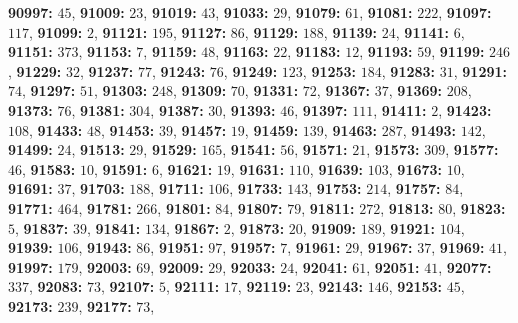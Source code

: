 \textsf{\bfseries 90997:} $45$, \textsf{\bfseries 91009:} $23$, \textsf{\bfseries 91019:} $43$, \textsf{\bfseries 91033:} $29$, \textsf{\bfseries 91079:} $61$, \textsf{\bfseries 91081:} $222$, \textsf{\bfseries 91097:} $117$, \textsf{\bfseries 91099:} $2$, \textsf{\bfseries 91121:} $195$, \textsf{\bfseries 91127:} $86$, \textsf{\bfseries 91129:} $188$, \textsf{\bfseries 91139:} $24$, \textsf{\bfseries 91141:} $6$, \textsf{\bfseries 91151:} $373$, \textsf{\bfseries 91153:} $7$, \textsf{\bfseries 91159:} $48$, \textsf{\bfseries 91163:} $22$, \textsf{\bfseries 91183:} $12$, \textsf{\bfseries 91193:} $59$, \textsf{\bfseries 91199:} $246$, \textsf{\bfseries 91229:} $32$, \textsf{\bfseries 91237:} $77$, \textsf{\bfseries 91243:} $76$, \textsf{\bfseries 91249:} $123$, \textsf{\bfseries 91253:} $184$, \textsf{\bfseries 91283:} $31$, \textsf{\bfseries 91291:} $74$, \textsf{\bfseries 91297:} $51$, \textsf{\bfseries 91303:} $248$, \textsf{\bfseries 91309:} $70$, \textsf{\bfseries 91331:} $72$, \textsf{\bfseries 91367:} $37$, \textsf{\bfseries 91369:} $208$, \textsf{\bfseries 91373:} $76$, \textsf{\bfseries 91381:} $304$, \textsf{\bfseries 91387:} $30$, \textsf{\bfseries 91393:} $46$, \textsf{\bfseries 91397:} $111$, \textsf{\bfseries 91411:} $2$, \textsf{\bfseries 91423:} $108$, \textsf{\bfseries 91433:} $48$, \textsf{\bfseries 91453:} $39$, \textsf{\bfseries 91457:} $19$, \textsf{\bfseries 91459:} $139$, \textsf{\bfseries 91463:} $287$, \textsf{\bfseries 91493:} $142$, \textsf{\bfseries 91499:} $24$, \textsf{\bfseries 91513:} $29$, \textsf{\bfseries 91529:} $165$, \textsf{\bfseries 91541:} $56$, \textsf{\bfseries 91571:} $21$, \textsf{\bfseries 91573:} $309$, \textsf{\bfseries 91577:} $46$, \textsf{\bfseries 91583:} $10$, \textsf{\bfseries 91591:} $6$, \textsf{\bfseries 91621:} $19$, \textsf{\bfseries 91631:} $110$, \textsf{\bfseries 91639:} $103$, \textsf{\bfseries 91673:} $10$, \textsf{\bfseries 91691:} $37$, \textsf{\bfseries 91703:} $188$, \textsf{\bfseries 91711:} $106$, \textsf{\bfseries 91733:} $143$, \textsf{\bfseries 91753:} $214$, \textsf{\bfseries 91757:} $84$, \textsf{\bfseries 91771:} $464$, \textsf{\bfseries 91781:} $266$, \textsf{\bfseries 91801:} $84$, \textsf{\bfseries 91807:} $79$, \textsf{\bfseries 91811:} $272$, \textsf{\bfseries 91813:} $80$, \textsf{\bfseries 91823:} $5$, \textsf{\bfseries 91837:} $39$, \textsf{\bfseries 91841:} $134$, \textsf{\bfseries 91867:} $2$, \textsf{\bfseries 91873:} $20$, \textsf{\bfseries 91909:} $189$, \textsf{\bfseries 91921:} $104$, \textsf{\bfseries 91939:} $106$, \textsf{\bfseries 91943:} $86$, \textsf{\bfseries 91951:} $97$, \textsf{\bfseries 91957:} $7$, \textsf{\bfseries 91961:} $29$, \textsf{\bfseries 91967:} $37$, \textsf{\bfseries 91969:} $41$, \textsf{\bfseries 91997:} $179$, \textsf{\bfseries 92003:} $69$, \textsf{\bfseries 92009:} $29$, \textsf{\bfseries 92033:} $24$, \textsf{\bfseries 92041:} $61$, \textsf{\bfseries 92051:} $41$, \textsf{\bfseries 92077:} $337$, \textsf{\bfseries 92083:} $73$, \textsf{\bfseries 92107:} $5$, \textsf{\bfseries 92111:} $17$, \textsf{\bfseries 92119:} $23$, \textsf{\bfseries 92143:} $146$, \textsf{\bfseries 92153:} $45$, \textsf{\bfseries 92173:} $239$, \textsf{\bfseries 92177:} $73$, 
